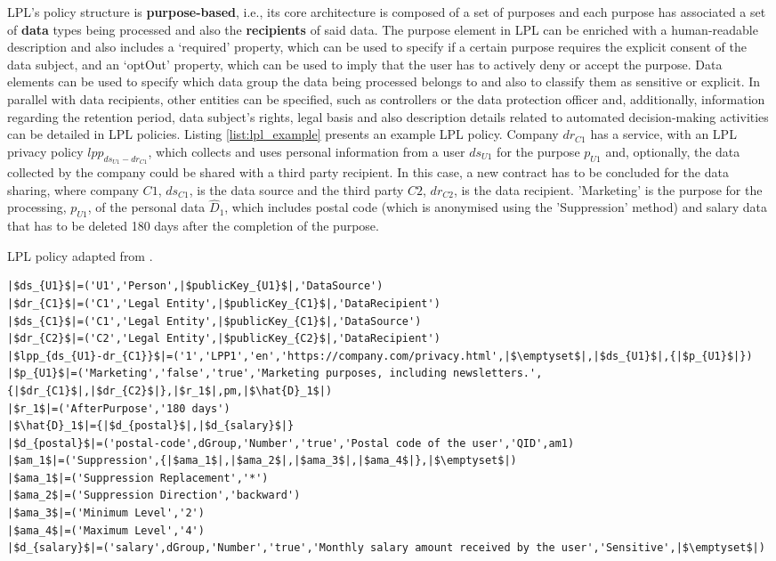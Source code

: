 LPL's policy structure is \textbf{purpose-based}, i.e., its core architecture is composed of a set of purposes and each purpose has associated a set of \textbf{data} types being processed and also the \textbf{recipients} of said data.
The purpose element in LPL can be enriched with a human-readable description and also includes a `required' property, which can be used to specify if a certain purpose requires the explicit consent of the data subject, and an `optOut' property, which can be used to imply that the user has to actively deny or accept the purpose.
Data elements can be used to specify which data group the data being processed belongs to and also to classify them as sensitive or explicit.
In parallel with data recipients, other entities can be specified, such as controllers or the data protection officer and, additionally, information regarding the retention period, data subject's rights, legal basis and also description details related to automated decision-making activities can be detailed in LPL policies.
Listing \ref{list:lpl_example} presents an example LPL policy. Company $dr_{C1}$ has a service, with an LPL privacy policy $lpp_{ds_{U1}-dr_{C1}}$, which collects and uses personal information from a user $ds_{U1}$ for the purpose $p_{U1}$ and, optionally, the data collected by the company could be shared with a third party recipient. In this case, a new contract has to be concluded for the data sharing, where company $C1$, $ds_{C1}$, is the data source and the third party $C2$, $dr_{C2}$, is the data recipient. 'Marketing' is the purpose for the processing, $p_{U1}$, of the personal data $\hat{D}_1$, which includes postal code (which is anonymised using the 'Suppression' method) and salary data that has to be deleted 180 days after the completion of the purpose.

\begin{listing}
\caption{LPL policy adapted from \cite{gerl_lpl_2018}.}
\label{list:lpl_example}
\begin{verbatim}
|$ds_{U1}$|=('U1','Person',|$publicKey_{U1}$|,'DataSource')
|$dr_{C1}$|=('C1','Legal Entity',|$publicKey_{C1}$|,'DataRecipient')
|$ds_{C1}$|=('C1','Legal Entity',|$publicKey_{C1}$|,'DataSource')
|$dr_{C2}$|=('C2','Legal Entity',|$publicKey_{C2}$|,'DataRecipient')
|$lpp_{ds_{U1}-dr_{C1}}$|=('1','LPP1','en','https://company.com/privacy.html',|$\emptyset$|,|$ds_{U1}$|,{|$p_{U1}$|})
|$p_{U1}$|=('Marketing','false','true','Marketing purposes, including newsletters.',{|$dr_{C1}$|,|$dr_{C2}$|},|$r_1$|,pm,|$\hat{D}_1$|)
|$r_1$|=('AfterPurpose','180 days')
|$\hat{D}_1$|={|$d_{postal}$|,|$d_{salary}$|}
|$d_{postal}$|=('postal-code',dGroup,'Number','true','Postal code of the user','QID',am1)
|$am_1$|=('Suppression',{|$ama_1$|,|$ama_2$|,|$ama_3$|,|$ama_4$|},|$\emptyset$|)
|$ama_1$|=('Suppression Replacement','*')
|$ama_2$|=('Suppression Direction','backward')
|$ama_3$|=('Minimum Level','2')
|$ama_4$|=('Maximum Level','4')
|$d_{salary}$|=('salary',dGroup,'Number','true','Monthly salary amount received by the user','Sensitive',|$\emptyset$|)
\end{verbatim}
\end{listing}

